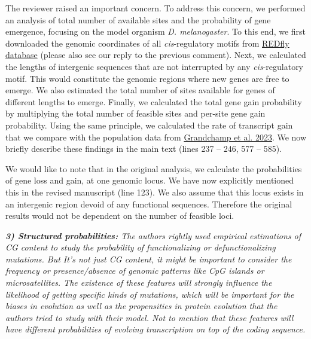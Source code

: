 \documentclass[12pt,a4paper]{article}
\begin{document}
The reviewer raised an important concern. To address this concern, we performed an analysis of total number of available sites and the probability of gene emergence, focusing on the model organism \textit{D. melanogaster}. To this end, we first downloaded the genomic coordinates of all \textit{cis}-regulatory motifs from \href{http://redfly.ccr.buffalo.edu/}{REDfly database} (please also see our reply to the previous comment). Next, we calculated the lengths of intergenic sequences that are not interrupted by any \textit{cis}-regulatory motif. This would constitute the genomic regions where new genes are free to emerge. We also estimated the total number of sites available for genes of different lengths to emerge. Finally, we calculated the total gene gain probability by multiplying the total number of feasible sites and per-site gene gain probability. Using the same principle, we calculated the rate of transcript gain that we compare with the population data from \href{https://doi.org/10.1101/2023.02.13.528330}{Grandchamp et al. 2023}.  We now briefly describe these findings in the main text (lines 237 -- 246, 577 -- 585).

We would like to note that in the original analysis, we calculate the probabilities of gene loss and gain, at one genomic locus. We have now explicitly mentioned this in the revised manuscript (line 123).  We also assume that this locus exists in an intergenic region devoid of any functional sequences. Therefore the original results would not be dependent on the number of feasible loci. 

{\itshape \textbf{3) Structured probabilities:} The authors rightly used empirical estimations of CG content to study the probability of functionalizing or defunctionalizing mutations. But It's not just CG content, it might be important to consider the frequency or presence/absence of genomic patterns like CpG islands or microsatellites. The existence of these features will strongly influence the likelihood of getting specific kinds of mutations, which will be important for the biases in evolution as well as the propensities in protein evolution that the authors tried to study with their model. Not to mention that these features will have different probabilities of evolving transcription on top of the coding sequence.}
\end{document}
